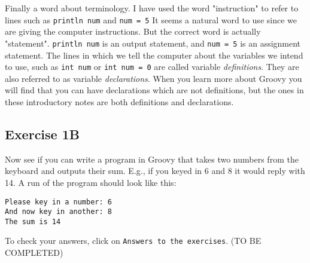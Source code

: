 Finally a word about terminology.  I have used the word "instruction"
to refer to lines such as \verb!println num! and \verb!num = 5!
It seems a natural word to use since we are giving the computer instructions.
But the correct word is actually "statement".  \verb!println num! is
an output statement, and \verb!num = 5! is an assignment statement.
The lines in which we tell the computer about the variables we intend to
use, such as \verb!int num! or \verb!int num = 0! are called variable \emph{definitions}.  They are also referred to as
variable \emph{declarations}.  When you learn more about Groovy you will
find that you can have declarations which are not definitions, but the
ones in these introductory notes are both definitions and declarations.

\subsection{Exercise 1B}

Now see if you can write a program in Groovy that takes
two numbers from the keyboard and outputs their sum. E.g., if you keyed in 6 and 8
it would reply with 14.  A run of the program should look like this:
\begin{Verbatim}
Please key in a number: 6
And now key in another: 8
The sum is 14
\end{Verbatim}
To check your answers, click on \verb!Answers to the exercises!. (TO BE COMPLETED)

